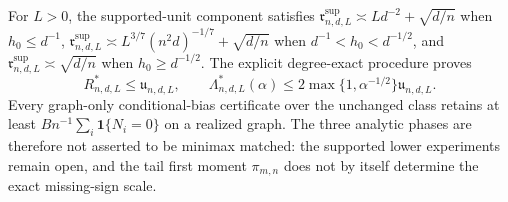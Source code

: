 For \(L>0\), the supported-unit component satisfies \(\mathfrak r^{\mathrm{sup}}_{n,d,L}\asymp Ld^{-2}+\sqrt{d/n}\) when \(h_0\leq d^{-1}\), \(\mathfrak r^{\mathrm{sup}}_{n,d,L}\asymp L^{3/7}(n^2d)^{-1/7}+\sqrt{d/n}\) when \(d^{-1}<h_0<d^{-1/2}\), and \(\mathfrak r^{\mathrm{sup}}_{n,d,L}\asymp\sqrt{d/n}\) when \(h_0\geq d^{-1/2}\).  The explicit degree-exact procedure proves
\[
 R^*_{n,d,L}\leq\mathfrak u_{n,d,L},
 \qquad
 \Lambda^*_{n,d,L}(\alpha)
 \leq2\max\{1,\alpha^{-1/2}\}\mathfrak u_{n,d,L}.
\]
Every graph-only conditional-bias certificate over the unchanged class retains at least \(Bn^{-1}\sum_i\mathbf1\{N_i=0\}\) on a realized graph.  The three analytic phases are therefore not asserted to be minimax matched: the supported lower experiments remain open, and the tail first moment \(\pi_{m,n}\) does not by itself determine the exact missing-sign scale.
